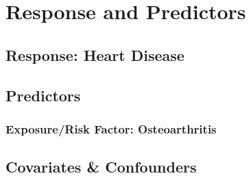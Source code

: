 \section{Response and Predictors}
\subsection{Response: Heart Disease}

\subsection{Predictors}
\subsubsection{Exposure/Risk Factor: Osteoarthritis}


\subsection{Covariates \& Confounders}

